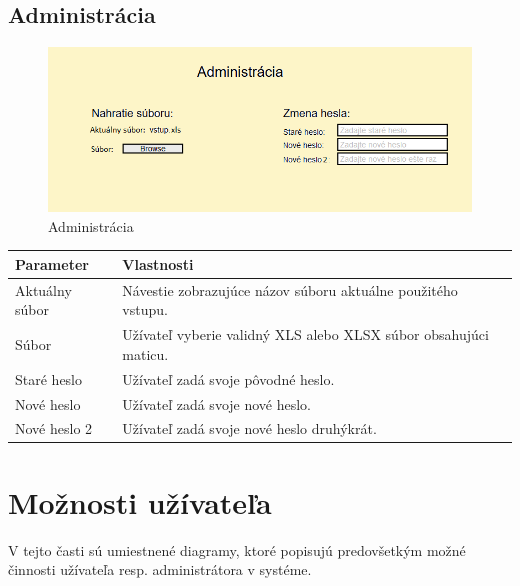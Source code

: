 \documentclass[12pt,a4paper]{report}
\begin{document}
\subsection[Administrácia]{\rmfamily\bfseries
	Administrácia}

\begin{figure}[!h]
	\centering
	\includegraphics[scale=0.7]{admin}
	\caption{Administrácia}
	\label{fig:Administrácia}
\end{figure}

\begin{table}[h!]
	\centering
	\begin{tabular}{|>{\centering\arraybackslash}m{3in}|>{\centering\arraybackslash}m{3in}|}
		\hline
		\centering Parameter & Vlastnosti \\ [0ex]
		\hline
		Aktuálny súbor & Návestie zobrazujúce názov súboru aktuálne použitého vstupu.\\ [0ex]
		\hline
		Súbor & Užívateľ vyberie validný XLS alebo XLSX súbor obsahujúci maticu. \\ [0ex]
		\hline
		Staré heslo & Užívateľ zadá svoje pôvodné heslo.\\ [0ex]	
		\hline
		Nové heslo & Užívateľ zadá svoje nové heslo. \\ [0ex]		
		\hline
		Nové heslo 2 & Užívateľ zadá svoje nové heslo druhýkrát. \\ [0ex]		
		\hline
	\end{tabular}
\end{table}
\FloatBarrier
\pagebreak
\section[Možnosti užívateľa]{\rmfamily\bfseries
	Možnosti užívateľa}

V tejto časti sú umiestnené diagramy, ktoré popisujú predovšetkým možné činnosti užívateľa resp. administrátora v systéme.
\end{document}
